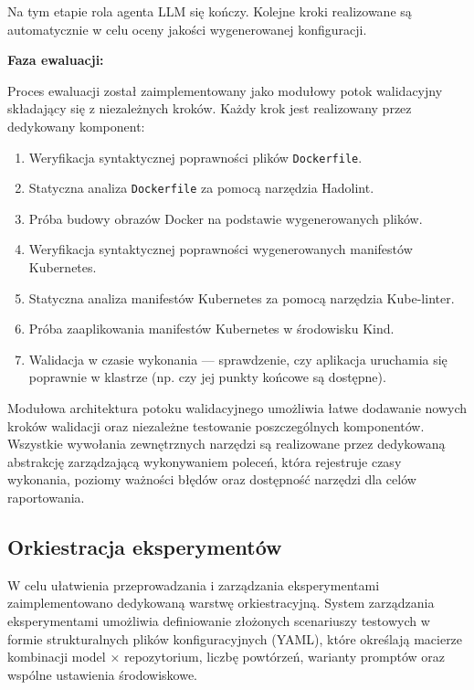 Na tym etapie rola agenta LLM się kończy. Kolejne kroki realizowane są automatycznie w celu oceny jakości wygenerowanej konfiguracji.

\noindent
\textbf{Faza ewaluacji:}

Proces ewaluacji został zaimplementowany jako modułowy potok walidacyjny składający się z niezależnych kroków. Każdy krok jest realizowany przez dedykowany komponent:

\begin{enumerate}[resume]
    \item Weryfikacja syntaktycznej poprawności plików \texttt{Dockerfile}.
    \item Statyczna analiza \texttt{Dockerfile} za pomocą narzędzia Hadolint.
    \item Próba budowy obrazów Docker na podstawie wygenerowanych plików.
    \item Weryfikacja syntaktycznej poprawności wygenerowanych manifestów Kubernetes.
    \item Statyczna analiza manifestów Kubernetes za pomocą narzędzia Kube-linter.
    \item Próba zaaplikowania manifestów Kubernetes w środowisku Kind.
    \item Walidacja w czasie wykonania — sprawdzenie, czy aplikacja uruchamia się poprawnie w klastrze (np. czy jej punkty końcowe są dostępne).
\end{enumerate}

Modułowa architektura potoku walidacyjnego umożliwia łatwe dodawanie nowych kroków walidacji oraz niezależne testowanie poszczególnych komponentów. Wszystkie wywołania zewnętrznych narzędzi są realizowane przez dedykowaną abstrakcję zarządzającą wykonywaniem poleceń, która rejestruje czasy wykonania, poziomy ważności błędów oraz dostępność narzędzi dla celów raportowania.

\subsection{Orkiestracja eksperymentów}

W celu ułatwienia przeprowadzania i zarządzania eksperymentami zaimplementowano dedykowaną warstwę orkiestracyjną. System zarządzania eksperymentami umożliwia definiowanie złożonych scenariuszy testowych w formie strukturalnych plików konfiguracyjnych (YAML), które określają macierze kombinacji model × repozytorium, liczbę powtórzeń, warianty promptów oraz wspólne ustawienia środowiskowe.

